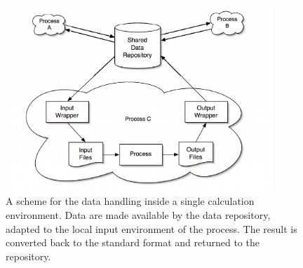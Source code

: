 \begin{center}
\begin{figure}[ht]
\begin{center}
\includegraphics[width=10cm,keepaspectratio]{04_grid/images/wrapper-scheme-gimped.eps}
\end{center}
\caption{\footnotesize A scheme for the data handling inside a single
calculation environment. Data are made available by the data repository,
adapted to the local input environment of the process. The result is
converted back to the standard format and returned to the repository.}
\label{fig:wrapper-scheme}
\end{figure}
\end{center}
